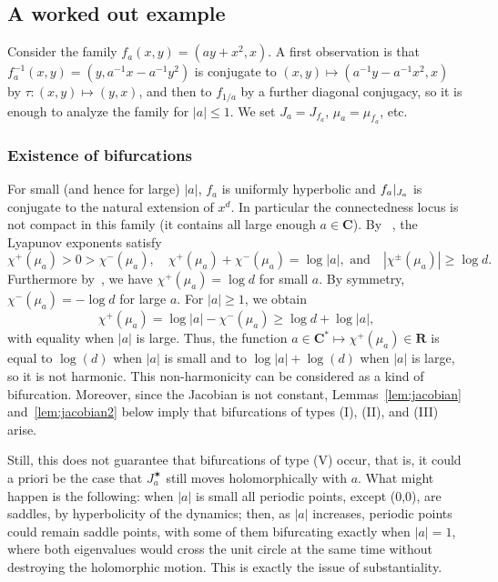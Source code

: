 \documentclass[oneside, 12pt]{amsart}
\newcommand{\abs}[1]{\left\vert#1\right\vert}
\newcommand{\rest}[1]{ \arrowvert_{#1}}
\newcommand{\lrpar}[1]{\left(#1\right)}
\newcommand{\inv}{^{-1}}
\newcommand{\jstar}{J^\varstar}
\newcommand{\C}{\mathbf{C}}
\newcommand{\R}{\mathbf{R}}
\theoremstyle{plain}
\theoremstyle{definition}
\numberwithin{equation}{section}       %
\numberwithin{equation}{section}       %
\begin{document}
\begin{vlongue}
\subsection{A worked out example} \label{subs:eg_fa}  
Consider the family $f_a(x,y) = (ay+x^2, x)$. A first observation is that 
$ f_a\inv(x,y)  = \lrpar{y, a\inv x -a\inv y^2 }$
 is conjugate to 
$(x,y)\mapsto (a\inv y - a\inv x^2, x)$ by $\tau\colon (x,y)\mapsto (y,x)$, and then   to 
$f_{1/a}$ by a further diagonal conjugacy, so it is enough to analyze the family  for $\abs{a}\leq 1$. 
We set $J_a=J_{f_a}$, $\mu_a=\mu_{f_a}$, etc.

\subsubsection{Existence of bifurcations} For small (and hence for large) $\abs{a}$, $f_a$ is uniformly hyperbolic and $f_a\rest{J_a}$  is 
conjugate to the natural extension of $x^d$. In particular the connectedness locus is not compact in this family (it contains all large enough $a\in \C$).  By ~\cite{bs3}, the  Lyapunov exponents satisfy 
$$\chi^+(\mu_a) >0>\chi^-(\mu_a), \quad
 \chi^+(\mu_a) + \chi^-(\mu_a)  = \log\abs{a},  \text{ and} \quad \abs{\chi^\pm(\mu_a)}\geq \log d.$$ Furthermore
  by~\cite{bs6}, we have $\chi^+(\mu_a) = \log d$ 
  for small $a$. By symmetry, $\chi^-(\mu_a) = -\log d$ for large $a$. For $\abs{a}\geq 1$, we obtain
  \begin{equation}
  \chi^+(\mu_a) = \log \abs{a}  - \chi^-(\mu_a) \geq \log d + \log \abs{a},
  \end{equation}
  with equality when $\abs{a}$ is large. Thus, 
  the function $a \in \C^*\mapsto   \chi^+(\mu_a)\in \R $ is  equal to $\log(d)$ when $\abs{a}$ is small and to $\log\abs{a}+\log(d)$ when $\abs{a}$ is large, so it is not 
  harmonic. This non-harmonicity can be considered as a kind of bifurcation. Moreover, 
  since the Jacobian is not constant, Lemmas~\ref{lem:jacobian} and~\ref{lem:jacobian2} below
  imply that bifurcations of types (I), (II), and (III) arise.
  
  Still, this does not guarantee that bifurcations of type (V) occur, that is, it could a priori be the case that $\jstar_a$  still moves holomorphically with $a$. 
  What might happen is the following: when $\abs{a}$ is small  all periodic points, except (0,0), are saddles, by hyperbolicity of the dynamics; then, as $\abs{a}$ increases, periodic points could remain saddle points,  with some of them bifurcating exactly when $\abs{a} = 1$, 
where  both eigenvalues would cross the unit circle at the same time
without destroying the holomorphic motion. This is exactly the issue of substantiality.
  


\end{vlongue}
\end{document}
